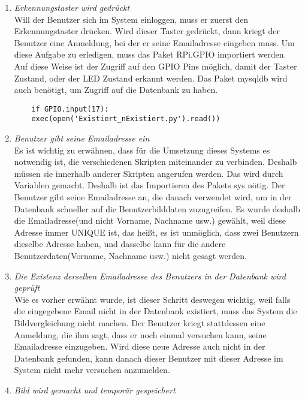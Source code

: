 \begin{enumerate}
	
	\item \textit{Erkennungstaster wird gedr{\"u}ckt} \\
	
	Will der Benutzer sich im System einloggen, muss er zuerst den Erkennungstaster dr{\"u}cken. Wird dieser Taster gedr{\"u}ckt, dann kriegt der Benutzer eine Anmeldung, bei der er seine Emailadresse eingeben muss. Um diese Aufgabe zu erledigen, muss das Paket RPi.GPIO importiert werden. Auf diese Weise ist der Zugriff auf den GPIO Pins m{\"o}glich, damit der Taster Zustand, oder der LED Zustand erkannt werden. Das Paket mysqldb wird auch ben{\"o}tigt, um Zugriff auf die Datenbank zu haben.
	\begin{lstlisting}
	if GPIO.input(17):
	exec(open('Existiert_nExistiert.py').read()) 
	\end{lstlisting} 
	\item \textit{Benutzer gibt seine Emailadresse ein} \\
	
Es ist wichtig zu erw{\"a}hnen, dass für die Umsetzung dieses Systems es notwendig ist, die verschiedenen Skripten miteinander zu verbinden.  Deshalb müssen sie innerhalb anderer Skripten angerufen werden. Das wird durch Variablen gemacht. Deshalb ist das Importieren des Pakets sys n{\"o}tig. Der Benutzer gibt seine Emailadresse an, die danach verwendet wird, um in der Datenbank schneller auf die Benutzerbilddaten zuzugreifen. Es wurde deshalb die Emailadresse(und nicht Vorname, Nachname usw.) gewählt, weil diese Adresse immer UNIQUE ist, das heißt, es ist unmöglich, dass zwei Benutzern dieselbe Adresse haben, und dasselbe kann für die andere Benutzerdaten(Vorname, Nachname usw.) nicht gesagt werden.
\item \textit{Die Existenz derselben Emailadresse des Benutzers in der Datenbank wird geprüft} \\

Wie es vorher erwähnt wurde, ist dieser Schritt deswegen wichtig, weil falls die eingegebene Email nicht in der Datenbank existiert, muss das System die Bildvergleichung nicht machen. Der Benutzer kriegt stattdessen eine Anmeldung, die ihm sagt, dass er noch einmal versuchen kann, seine Emailadresse einzugeben. Wird diese neue Adresse auch nicht in der Datenbank gefunden, kann danach dieser Benutzer mit dieser Adresse im System nicht mehr versuchen anzumelden. 
\item \textit{Bild wird gemacht und tempor{\"a}r gespeichert} \\


\end{enumerate}
